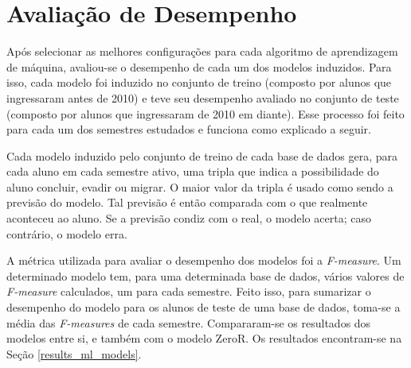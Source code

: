 \section{Avaliação de Desempenho}
Após selecionar as melhores configurações para cada algoritmo de aprendizagem de
máquina, avaliou-se o desempenho de cada um dos modelos induzidos. Para isso, cada
modelo foi induzido no conjunto de treino (composto por alunos
que ingressaram antes de 2010) e teve seu desempenho avaliado no conjunto de teste
(composto por alunos que ingressaram de 2010 em diante). Esse processo foi feito para
cada um dos semestres estudados e funciona como explicado a seguir. 
\par Cada modelo induzido pelo conjunto de treino de cada base de dados gera, para
cada aluno em cada semestre ativo, uma tripla que indica a possibilidade do aluno
concluir, evadir ou migrar. O
maior valor da tripla é usado como sendo a previsão do modelo. Tal previsão é
então comparada com o que realmente aconteceu ao aluno. Se a previsão condiz com o
real, o modelo acerta; caso contrário, o modelo erra. 
\par A métrica utilizada para avaliar o desempenho dos
modelos foi a \textit{F-measure}. Um determinado modelo tem, para uma determinada
base de dados, vários valores de \textit{F-measure} calculados, um para cada semestre. Feito
isso, para sumarizar o desempenho do modelo para os alunos de teste de uma base de
dados, toma-se a média das \textit{F-measures} de cada semestre. Compararam-se os
resultados dos modelos entre si, e também com o modelo ZeroR. Os resultados
encontram-se na Seção \ref{results_ml_models}.


